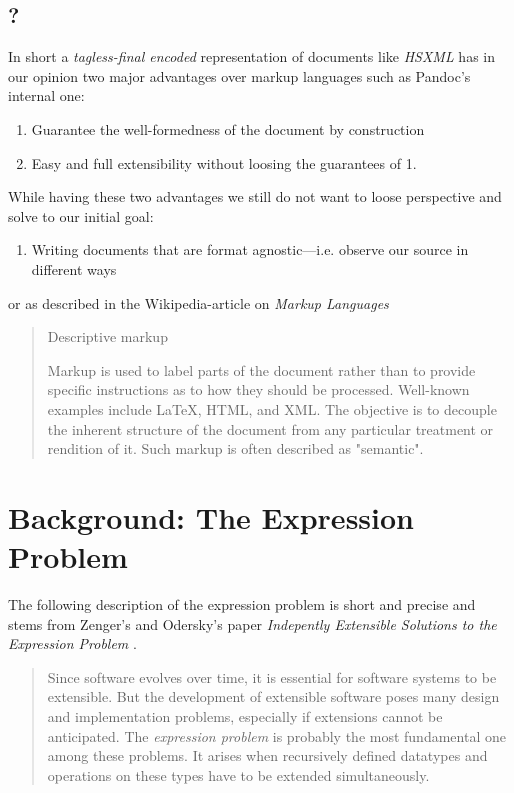 \subsection{?}

In short a \emph{tagless-final encoded} representation of documents like
\emph{HSXML} has in our opinion two major advantages over markup languages such
as Pandoc’s internal one:

\begin{enumerate}
\item Guarantee the well-formedness of the document by construction
\item Easy and full extensibility without loosing the guarantees of 1.
\end{enumerate}

While having these two advantages we still do not want to loose perspective and
solve to our initial goal:

\begin{enumerate}
\item Writing documents that are format agnostic—i.e. observe our source in
different ways
\end{enumerate}

or as described in the Wikipedia-article on \emph{Markup Languages}

\begin{quote}
Descriptive markup

Markup is used to label parts of the document rather than to provide specific
instructions as to how they should be processed. Well-known examples include
\LaTeX{}, HTML, and XML. The objective is to decouple the inherent structure of
the document from any particular treatment or rendition of it. Such markup is
often described as "semantic".
\end{quote}

\clearpage

\section{Background: The Expression Problem} \label{section_ep}

The following description of the expression problem is short and precise and
stems from Zenger’s and Odersky’s paper \emph{Indepently Extensible Solutions to
  the Expression Problem} \cite{indie_solutions}.

\begin{quote}
  Since software evolves over time, it is essential for software systems to be
  extensible. But the development of extensible software poses many design and
  implementation problems, especially if extensions cannot be anticipated. The
  \emph{expression problem} is probably the most fundamental one among these
  problems. It arises when recursively defined datatypes and operations on
  these types have to be extended simultaneously.
\end{quote}

